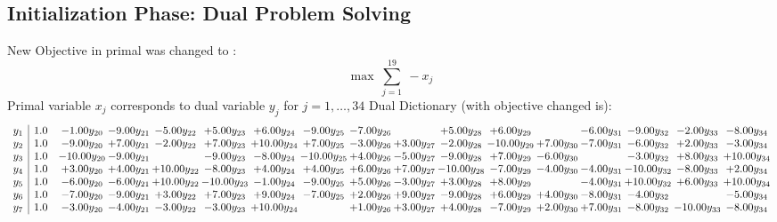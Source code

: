 \documentclass[9pt]{article}
\begin{document}
\subsection{Initialization Phase: Dual Problem Solving}
New Objective in primal was changed to : \[ \max\ \sum_{j=1}^{19}\ - x_j \] 
Primal variable $x_j$ corresponds to dual variable $y_j$ for $j = 1,\ldots,34$
Dual Dictionary (with objective changed is): 
\[\begin{array}{c| c c@{\hskip 2pt} c@{\hskip 2pt} c@{\hskip 2pt} c@{\hskip 2pt} c@{\hskip 2pt} c@{\hskip 2pt} c@{\hskip 2pt} c@{\hskip 2pt} c@{\hskip 2pt} c@{\hskip 2pt} c@{\hskip 2pt} c@{\hskip 2pt} c@{\hskip 2pt} c@{\hskip 2pt} c@{\hskip 2pt} }
 y_{1}   &  1.0 & -1.00 y_{20} & -9.00 y_{21} & -5.00 y_{22} & +  5.00 y_{23} & +  6.00 y_{24} & -9.00 y_{25} & -7.00 y_{26} &   & +  5.00 y_{28} & +  6.00 y_{29} &   & -6.00 y_{31} & -9.00 y_{32} & -2.00 y_{33} & -8.00 y_{34}\\
 y_{2}   &  1.0 & -9.00 y_{20} & +  7.00 y_{21} & -2.00 y_{22} & +  7.00 y_{23} & + 10.00 y_{24} & +  7.00 y_{25} & -3.00 y_{26} & +  3.00 y_{27} & -2.00 y_{28} & -10.00 y_{29} & +  7.00 y_{30} & -7.00 y_{31} & -6.00 y_{32} & +  2.00 y_{33} & -3.00 y_{34}\\
 y_{3}   &  1.0 & -10.00 y_{20} & -9.00 y_{21} &   & -9.00 y_{23} & -8.00 y_{24} & -10.00 y_{25} & +  4.00 y_{26} & -5.00 y_{27} & -9.00 y_{28} & +  7.00 y_{29} & -6.00 y_{30} &   & -3.00 y_{32} & +  8.00 y_{33} & + 10.00 y_{34}\\
 y_{4}   &  1.0 & +  3.00 y_{20} & +  4.00 y_{21} & + 10.00 y_{22} & -8.00 y_{23} & +  4.00 y_{24} & +  4.00 y_{25} & +  6.00 y_{26} & +  7.00 y_{27} & -10.00 y_{28} & -7.00 y_{29} & -4.00 y_{30} & -4.00 y_{31} & -10.00 y_{32} & -8.00 y_{33} & +  2.00 y_{34}\\
 y_{5}   &  1.0 & -6.00 y_{20} & -6.00 y_{21} & + 10.00 y_{22} & -10.00 y_{23} & -1.00 y_{24} & -9.00 y_{25} & +  5.00 y_{26} & -3.00 y_{27} & +  3.00 y_{28} & +  8.00 y_{29} &   & -4.00 y_{31} & + 10.00 y_{32} & +  6.00 y_{33} & + 10.00 y_{34}\\
 y_{6}   &  1.0 & -7.00 y_{20} & -9.00 y_{21} & +  3.00 y_{22} & +  7.00 y_{23} & +  9.00 y_{24} & -7.00 y_{25} & +  2.00 y_{26} & +  9.00 y_{27} & -9.00 y_{28} & +  6.00 y_{29} & +  4.00 y_{30} & -8.00 y_{31} & -4.00 y_{32} &   & -5.00 y_{34}\\
 y_{7}   &  1.0 & -3.00 y_{20} & -4.00 y_{21} & -3.00 y_{22} & -3.00 y_{23} & + 10.00 y_{24} &   & +  1.00 y_{26} & +  3.00 y_{27} & +  4.00 y_{28} & -7.00 y_{29} & +  2.00 y_{30} & +  7.00 y_{31} & -8.00 y_{32} & -10.00 y_{33} & -8.00 y_{34}\\

\end{array}\]
\end{document}
